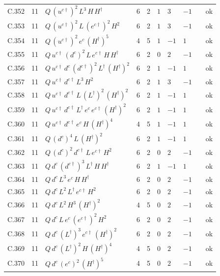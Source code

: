 {\begin{longtable}{@{}ll>{\raggedright\arraybackslash}p{6.4cm}rrllllr@{}}
C.352 & 11 & $Q\,(u^{c\dagger})^{2}\,L^{3}\,H\,H^\dagger$ & 6 & 2 & $1$ & $3$ & $-1$ &  & ok \\
C.353 & 11 & $Q\,(u^{c\dagger})^{2}\,L\,(e^{c\dagger})^{2}\,H^{2}$ & 6 & 2 & $1$ & $3$ & $-1$ &  & ok \\
C.354 & 11 & $Q\,(u^{c\dagger})^{2}\,e^c\,(H^\dagger)^{5}$ & 4 & 5 & $1$ & $-1$ & $1$ &  & ok \\
C.355 & 11 & $Q\,u^{c\dagger}\,(d^c)^{2}\,L\,e^{c\dagger}\,H\,H^\dagger$ & 6 & 2 & $0$ & $2$ & $-1$ &  & ok \\
C.356 & 11 & $Q\,u^{c\dagger}\,d^c\,(d^{c\dagger})^{2}\,L^\dagger\,(H^\dagger)^{2}$ & 6 & 2 & $1$ & $-1$ & $1$ &  & ok \\
C.357 & 11 & $Q\,u^{c\dagger}\,d^{c\dagger}\,L^{3}\,H^{2}$ & 6 & 2 & $1$ & $3$ & $-1$ &  & ok \\
C.358 & 11 & $Q\,u^{c\dagger}\,d^{c\dagger}\,L\,(L^\dagger)^{2}\,(H^\dagger)^{2}$ & 6 & 2 & $1$ & $-1$ & $1$ &  & ok \\
C.359 & 11 & $Q\,u^{c\dagger}\,d^{c\dagger}\,L^\dagger\,e^c\,e^{c\dagger}\,(H^\dagger)^{2}$ & 6 & 2 & $1$ & $-1$ & $1$ &  & ok \\
C.360 & 11 & $Q\,u^{c\dagger}\,d^{c\dagger}\,e^c\,H\,(H^\dagger)^{4}$ & 4 & 5 & $1$ & $-1$ & $1$ &  & ok \\
C.361 & 11 & $Q\,(d^c)^{4}\,L\,(H^\dagger)^{2}$ & 6 & 2 & $1$ & $-1$ & $1$ &  & ok \\
C.362 & 11 & $Q\,(d^c)^{2}\,d^{c\dagger}\,L\,e^{c\dagger}\,H^{2}$ & 6 & 2 & $0$ & $2$ & $-1$ &  & ok \\
C.363 & 11 & $Q\,d^c\,(d^{c\dagger})^{3}\,L^\dagger\,H\,H^\dagger$ & 6 & 2 & $1$ & $-1$ & $1$ &  & ok \\
C.364 & 11 & $Q\,d^c\,L^{3}\,e^c\,H\,H^\dagger$ & 6 & 2 & $0$ & $2$ & $-1$ &  & ok \\
C.365 & 11 & $Q\,d^c\,L^{2}\,L^\dagger\,e^{c\dagger}\,H^{2}$ & 6 & 2 & $0$ & $2$ & $-1$ &  & ok \\
C.366 & 11 & $Q\,d^c\,L^{2}\,H^{3}\,(H^\dagger)^{2}$ & 4 & 5 & $0$ & $2$ & $-1$ &  & ok \\
C.367 & 11 & $Q\,d^c\,L\,e^c\,(e^{c\dagger})^{2}\,H^{2}$ & 6 & 2 & $0$ & $2$ & $-1$ &  & ok \\
C.368 & 11 & $Q\,d^c\,(L^\dagger)^{3}\,e^{c\dagger}\,(H^\dagger)^{2}$ & 6 & 2 & $0$ & $2$ & $-1$ &  & ok \\
C.369 & 11 & $Q\,d^c\,(L^\dagger)^{2}\,H\,(H^\dagger)^{4}$ & 4 & 5 & $0$ & $2$ & $-1$ &  & ok \\
C.370 & 11 & $Q\,d^c\,(e^c)^{2}\,(H^\dagger)^{5}$ & 4 & 5 & $0$ & $2$ & $-1$ &  & ok \\

\end{longtable}}
